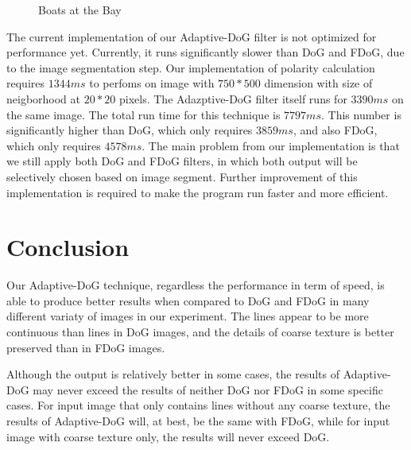 \begin{figure}[H]
	\centering
	\caption{Boats at the Bay}\label{fig:Compare4}
\end{figure}
The current implementation of our Adaptive-DoG filter is not optimized for performance yet. Currently, it runs significantly slower than DoG and FDoG, due to the image segmentation step. Our implementation of polarity calculation requires $1344 ms$ to perfoms on image with $750*500$ dimension with size of neigborhood at $20*20$ pixels. The Adazptive-DoG filter itself runs for $3390 ms$ on the same image. The total run time for this technique is $7797 ms$. This number is significantly higher than DoG, which only requires $3859 ms$, and also FDoG, which only requires $4578 ms$. The main problem from our implementation is that we still apply both DoG and FDoG filters, in which both output will be selectively chosen based on image segment. Further improvement of this implementation is required to make the program run faster and more efficient.

\chapter{Conclusion}
Our Adaptive-DoG technique, regardless the performance in term of speed, is able to produce better results when compared to DoG and FDoG in many different variaty of images in our experiment. The lines appear to be more continuous than lines in DoG images, and the details of coarse texture is better preserved than in FDoG images.

Although the output is relatively better in some cases, the results of Adaptive-DoG may never exceed the results of neither DoG nor FDoG in some specific cases. For input image that only contains lines without any coarse texture, the results of Adaptive-DoG will, at best, be the same with FDoG, while for input image with coarse texture only, the results will never exceed DoG.

